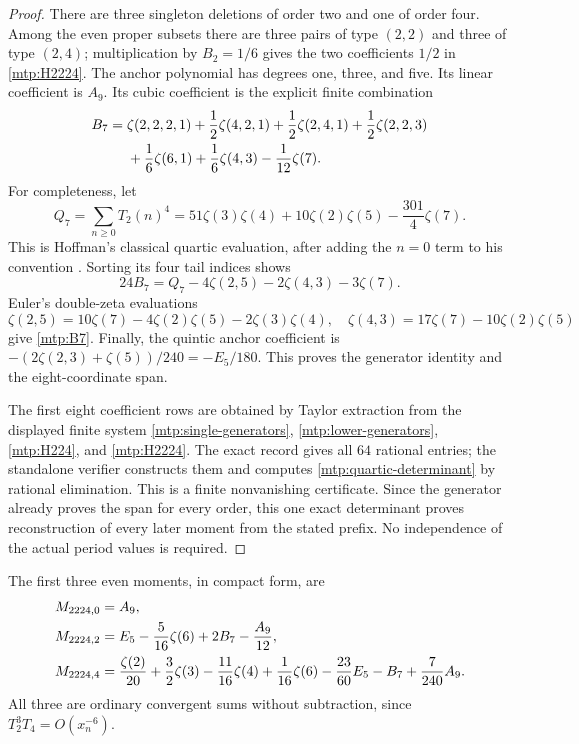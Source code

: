 \documentclass[11pt,letterpaper]{article}
\numberwithin{equation}{section}
\theoremstyle{definition}
\theoremstyle{remark}
\begin{document}
\begin{proof}
There are three singleton deletions of order two and one of order four.
Among the even proper subsets there are three pairs of type $(2,2)$
and three of type $(2,4)$; multiplication by $B_2=1/6$ gives the two
coefficients $1/2$ in \eqref{mtp:H2224}. The anchor polynomial has
degrees one, three, and five. Its linear coefficient is $A_9$.
Its cubic coefficient is the explicit finite combination
\begin{align}
 B_7={}&\zeta(2,2,2,1)+\frac12\zeta(4,2,1)+\frac12\zeta(2,4,1)
          +\frac12\zeta(2,2,3)\notag\\
       &+\frac16\zeta(6,1)+\frac16\zeta(4,3)-\frac1{12}\zeta(7).
       \label{mtp:B7-MZV}
\end{align}
For completeness, let
\[
 Q_7=\sum_{n\ge0}T_2(n)^4
     =51\zeta(3)\zeta(4)+10\zeta(2)\zeta(5)-\frac{301}{4}\zeta(7).
\]
This is Hoffman's classical quartic evaluation, after adding the
$n=0$ term to his convention \cite[following Corollary 4.4]{Hoffman}.
Sorting its four tail indices shows
\[
 24B_7=Q_7-4\zeta(2,5)-2\zeta(4,3)-3\zeta(7).
\]
Euler's double-zeta evaluations
\[
 \zeta(2,5)=10\zeta(7)-4\zeta(2)\zeta(5)-2\zeta(3)\zeta(4),
 \quad \zeta(4,3)=17\zeta(7)-10\zeta(2)\zeta(5)
\]
give \eqref{mtp:B7}. Finally, the quintic anchor coefficient is
$-(2\zeta(2,3)+\zeta(5))/240=-E_5/180$.
This proves the generator identity and the eight-coordinate span.

The first eight coefficient rows are obtained by Taylor extraction
from the displayed finite system
\eqref{mtp:single-generators}, \eqref{mtp:lower-generators},
\eqref{mtp:H224}, and \eqref{mtp:H2224}. The exact record gives all
$64$ rational entries; the standalone verifier constructs them and
computes \eqref{mtp:quartic-determinant} by rational elimination.
This is a finite nonvanishing certificate. Since the generator already
proves the span for every order, this one exact determinant proves
reconstruction of every later moment from the stated prefix.
No independence of the actual period values is required.
\end{proof}

The first three even moments, in compact form, are
\begin{align}
 M_{2224,0}&=A_9,\notag\\
 M_{2224,2}&=E_5-\frac5{16}\zeta(6)+2B_7-\frac{A_9}{12},
       \label{mtp:quartic-first}\\
 M_{2224,4}&=\frac{\zeta(2)}{20}+\frac32\zeta(3)-\frac{11}{16}\zeta(4)
             +\frac1{16}\zeta(6)-\frac{23}{60}E_5-B_7+\frac7{240}A_9.
       \notag
\end{align}
All three are ordinary convergent sums without subtraction, since
$T_2^3T_4=O(x_n^{-6})$.
\end{document}

